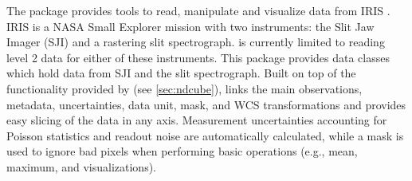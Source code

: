 The  package provides tools to read, manipulate and visualize data from IRIS \citep{DePontieu2014}.
IRIS is a NASA Small Explorer mission with two instruments: the Slit Jaw Imager (SJI) and a rastering slit spectrograph.
 is currently limited to reading level 2 data for either of these instruments.
This package provides data classes which hold data from SJI and the slit spectrograph.
Built on top of the functionality provided by  (see \autoref{sec:ndcube}),  links the main observations, metadata, uncertainties, data unit, mask, and WCS transformations and provides easy slicing of the data in any axis.
Measurement uncertainties accounting for Poisson statistics and readout noise are automatically calculated, while a mask is used to ignore bad pixels when performing basic operations (e.g., mean, maximum, and visualizations).
